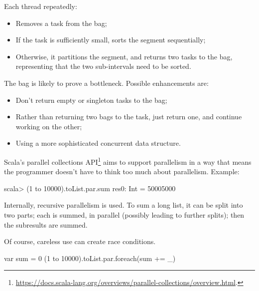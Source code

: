 \begin{slide}


Each thread repeatedly:
%
\begin{itemize}
\item Removes a task from the bag;

\item If the task is sufficiently small, sorts the segment sequentially;

\item Otherwise, it partitions the segment, and returns two tasks to the bag,
  representing that the two sub-intervals need to be sorted.
\end{itemize}

The bag is likely to prove a bottleneck.  Possible enhancements are:
%
\begin{itemize}
\item Don't return empty or singleton tasks to the bag;

\item Rather than returning two bags to the task, just return one, and
  continue working on the other;

\item Using a more sophisticated concurrent data structure.
\end{itemize}
\end{slide}



\begin{slide}

Scala's parallel collections
API\footnote{%
\url{https://docs.scala-lang.org/overviews/parallel-collections/overview.html}.}
aims to support parallelism in a way that means the programmer doesn't have to
think too much about parallelism.  Example:
%
\begin{scala}
scala> (1 to 10000).toList.par.sum
res0: Int = 50005000
\end{scala}

Internally, recursive parallelism is used.  To sum a long list, it can be
split into two parts; each is summed, in parallel (possibly leading to further
splits); then the subresults are summed. 

Of course, careless use can create race conditions.
\begin{scala}
  var sum = 0
  (1 to 10000).toList.par.foreach(sum += _)
\end{scala}

\vfill
\end{slide}

